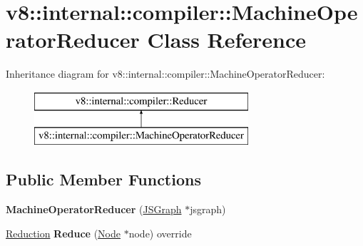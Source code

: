 \hypertarget{classv8_1_1internal_1_1compiler_1_1_machine_operator_reducer}{}\section{v8\+:\+:internal\+:\+:compiler\+:\+:Machine\+Operator\+Reducer Class Reference}
\label{classv8_1_1internal_1_1compiler_1_1_machine_operator_reducer}
Inheritance diagram for v8\+:\+:internal\+:\+:compiler\+:\+:Machine\+Operator\+Reducer\+:\begin{figure}[H]
\begin{center}
\leavevmode
\includegraphics[height=2.000000cm]{classv8_1_1internal_1_1compiler_1_1_machine_operator_reducer}
\end{center}
\end{figure}
\subsection*{Public Member Functions}
\begin{DoxyCompactItemize}
\item 
{\bfseries Machine\+Operator\+Reducer} (\hyperlink{classv8_1_1internal_1_1compiler_1_1_j_s_graph}{J\+S\+Graph} $\ast$jsgraph)\hypertarget{classv8_1_1internal_1_1compiler_1_1_machine_operator_reducer_a0b1b6f4c10af80a15adfae1757dc3e8f}{}\label{classv8_1_1internal_1_1compiler_1_1_machine_operator_reducer_a0b1b6f4c10af80a15adfae1757dc3e8f}

\item 
\hyperlink{classv8_1_1internal_1_1compiler_1_1_reduction}{Reduction} {\bfseries Reduce} (\hyperlink{classv8_1_1internal_1_1compiler_1_1_node}{Node} $\ast$node) override\hypertarget{classv8_1_1internal_1_1compiler_1_1_machine_operator_reducer_ab8422c43e957c6b10d62ec01c9a8ab50}{}\label{classv8_1_1internal_1_1compiler_1_1_machine_operator_reducer_ab8422c43e957c6b10d62ec01c9a8ab50}

\end{DoxyCompactItemize}
